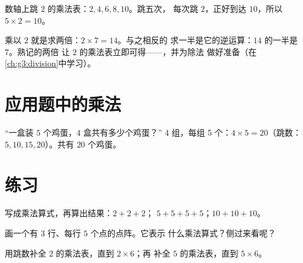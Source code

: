 \begin{omfigure}

{\small 数轴上跳 $2$ 的乘法表：$2, 4, 6, 8, 10$。跳五次，
每次跳 $2$，正好到达 $10$，所以 $5 \times 2 = 10$。}
\end{omfigure}

\begin{example}[两倍与一半]\label{ex:g2:mult:double}
乘以 $2$ 就是求两倍：$2 \times 7 = 14$。与之相反的
求一半是它的逆运算：$14$ 的一半是 $7$。熟记的两倍
让 $2$ 的乘法表立即可得——，并为除法
做好准备（在\cref{ch:g3:division}中学习）。
\end{example}

\section{应用题中的乘法}

\begin{example}\label{ex:g2:mult:problem}
“一盒装 $5$ 个鸡蛋，$4$ 盒共有多少个鸡蛋？”
4 组，每组 5 个：$4 \times 5 = 20$（跳数：$5, 10, 15, 20$）。共有
$20$ 个鸡蛋。
\end{example}

\section{练习}

\begin{exercise}[$\star$]\label{exo:g2:mult:1}
写成乘法算式，再算出结果：$2 + 2 + 2$；\quad
$5 + 5 + 5 + 5$；\quad $10 + 10 + 10$。
\end{exercise}

\begin{exercise}[$\star$]\label{exo:g2:mult:2}
画一个有 $3$ 行、每行 $5$ 个点的点阵。它表示
什么乘法算式？侧过来看呢？
\end{exercise}

\begin{exercise}[$\star$]\label{exo:g2:mult:3}
用跳数补全 $2$ 的乘法表，直到 $2 \times 6$；再
补全 $5$ 的乘法表，直到 $5 \times 6$。
\end{exercise}

